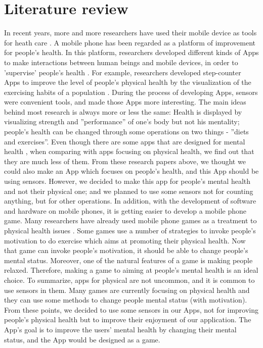 \documentclass{sigchi}
\begin{document}
\section{Literature review}
In recent years, more and more researchers have used their mobile device as tools for heath care \cite{ventolal} \cite{healthcarepocket}. A mobile phone has been regarded as a platform of improvement for people's health. In this platform, researchers developed different kinds of Apps to make interactions between human beings and mobile devices, in order to 'supervise' people's health \cite{healthcarepocket}. For example, researchers developed step-counter Apps to improve the level of people's physical health by the visualization of the exercising habits of a population \cite{stepup}. During the process of developing Apps, sensors were convenient tools, and made those Apps more interesting. The main ideas behind most research is always more or less the same: Health is displayed by visualizing strength and ''performance'' of one's body but not his mentality; people's health can be changed through some operations on two things - ''diets and exercises''. Even though there are some apps that are designed for mental health \cite{devmental}, when comparing with apps focusing on physical health, we find out that they are much less of them.  
From these research papers above, we thought we could also make an App which focuses on people's health, and this App should be using sensors. However, we decided to make this app for people's mental health and not their physical one; and we planned to use some sensors not for counting anything, but for other operations.
In addition, with the development of software and  hardware on mobile phones, it is getting easier to develop a mobile phone game. Many researchers have already used mobile phone games as a treatment to physical health issues \cite{seriousgames} \cite{seriousgameshealth}. Some games use a number of strategies to invoke people's motivation to do exercise which aims at promoting their physical health. Now that game can invoke people's motivation, it should be able to change people's mental status. Moreover, one of the natural features of a game is making people relaxed.  Therefore, making a game to aiming at people's mental health is an ideal choice.
To summarize, apps for physical are not uncommon, and it is common to use sensors in them. Many games are currently focusing on physical health and they can use some methods to change people mental status (with motivation). From these points, we decided to use some sensors in our Apps, not for improving people's physical health but to improve their enjoyment of our application. The App's goal is to improve the users' mental health by changing their mental status, and the App would be designed as a game.
\end{document}
